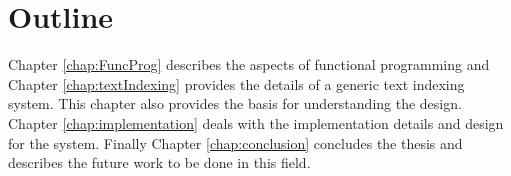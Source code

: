 \section{Outline}
Chapter \ref{chap:FuncProg} describes the aspects of functional programming and
Chapter \ref{chap:textIndexing} provides the details of a generic text indexing system.
This chapter also provides the basis for understanding the design.
Chapter \ref{chap:implementation} deals with the implementation details and design for the system.
Finally Chapter \ref{chap:conclusion} concludes the thesis and describes the future work to be done in this field.

